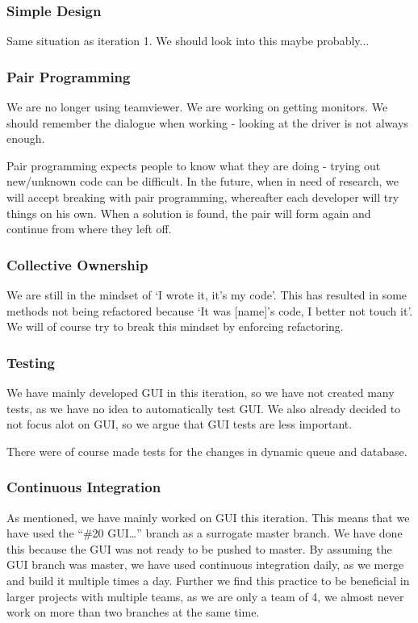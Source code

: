 \subsubsection{Simple Design}
Same situation as iteration 1. We should look into this maybe probably...

\subsubsection{Pair Programming}
We are no longer using teamviewer. We are working on getting monitors.
We should remember the dialogue when working - looking at the driver is not always enough.

Pair programming expects people to know what they are doing - trying out new/unknown code can be difficult. In the future, when in need of research, we will accept breaking with pair programming, whereafter each developer will try things on his own. When a solution is found, the pair will form again and continue from where they left off.

\subsubsection{Collective Ownership}
We are still in the mindset of `I wrote it, it’s my code'. This has resulted in some methods not being refactored because `It was [name]’s code, I better not touch it'. We will of course try to break this mindset by enforcing refactoring.

\subsubsection{Testing}
We have mainly developed GUI in this iteration, so we have not created many tests, as we have no idea to automatically test GUI. We also already decided to not focus alot on GUI, so we argue that GUI tests are less important.

There were of course made tests for the changes in dynamic queue and database.

\subsubsection{Continuous Integration}
As mentioned, we have mainly worked on GUI this iteration. This means that we have used the ``\#20 GUI…'' branch as a surrogate master branch. We have done this because the GUI was not ready to be pushed to master. By assuming the GUI branch was master, we have used continuous integration daily, as we merge and build it multiple times a day.
Further we find this practice to be beneficial in larger projects with multiple teams, as we are only a team of 4, we almost never work on more than two branches at the same time. 
